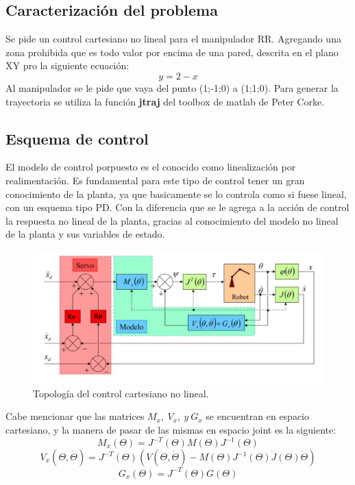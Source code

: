 %

%

\subsection{Caracterizaci\'on del problema}
Se pide un control cartesiano no lineal para el manipulador RR. Agregando una zona prohibida que es todo valor por encima de una pared, descrita en el plano XY pro la siguiente ecuaci\'on:
\begin{equation}
y=2-x
\end{equation}
Al manipulador se le pide que vaya del punto (1;-1;0) a (1;1;0). Para generar la trayectoria se utiliza la función \textbf{jtraj} del toolbox de matlab de Peter Corke.
\subsection{Esquema de control}
El modelo de control porpuesto es el conocido como linealizaci\'on por realimentaci\'on.
Es fundamental para este tipo de control tener un gran conocimiento de la planta, ya que basicamente se lo controla como si fuese lineal, con un esquema tipo PD. Con la diferencia que se le agrega  a la acci\'on de control la respuesta no lineal de la planta, gracias al conocimiento del modelo no lineal de la planta y sus variables de estado.
\begin{figure}[H]
	\centering
	\includegraphics[width=0.8\linewidth]{ImagenesControl de posición no lineal/modelo_control_p}
	\caption{Topolog\'ia del control cartesiano no lineal.}	
	\label{fig:control_p_modelo}
\end{figure}
Cabe mencionar que las matrices $M_x,\ V_x, \ y \ G_x$ se encuentran en espacio cartesiano, y la manera de pasar de las mismas en espacio joint es la siguiente:
\begin{equation}
M_x(\Theta) = J^{-T}(\Theta) M(\Theta) J^{-1}(\Theta)
\end{equation} 
\begin{equation}
V_x(\Theta , \dot{\Theta}) = J^{-T}(\Theta) \left( V(\Theta , \dot{\Theta}) - M(\Theta) J^{-1}(\Theta) \dot{J}(\Theta) \dot{\Theta} \right)
\end{equation} 
\begin{equation}
G_x(\Theta) = J^{-T}(\Theta) G(\Theta) 
\end{equation} 
%
